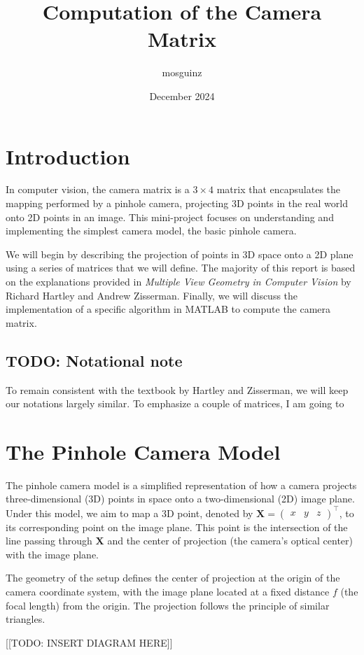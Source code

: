 \documentclass[12pt]{article}
\title{Computation of the Camera Matrix}
\author{mosguinz}
\date{December 2024}
\begin{document}
\section{Introduction}

In computer vision, the camera matrix is a $3 \times 4$ matrix that encapsulates the mapping performed by a pinhole camera, projecting 3D points in the real world onto 2D points in an image. This mini-project focuses on understanding and implementing the simplest camera model, the basic pinhole camera.

We will begin by describing the projection of points in 3D space onto a 2D plane using a series of matrices that we will define. The majority of this report is based on the explanations provided in \textit{Multiple View Geometry in Computer Vision} by Richard Hartley and Andrew Zisserman. Finally, we will discuss the implementation of a specific algorithm in MATLAB to compute the camera matrix.

\subsection{TODO: Notational note}

To remain consistent with the textbook by Hartley and Zisserman, we will keep our notations largely similar. To emphasize a couple of matrices, I am going to 

\section{The Pinhole Camera Model}

The pinhole camera model is a simplified representation of how a camera projects three-dimensional (3D) points in space onto a two-dimensional (2D) image plane. Under this model, we aim to map a 3D point, denoted by 
$\mathbf{X} = \begin{pmatrix} x & y & z \end{pmatrix}^\top$, 
to its corresponding point on the image plane. This point is the intersection of the line passing through $\mathbf{X}$ and the center of projection (the camera's optical center) with the image plane.

The geometry of the setup defines the center of projection at the origin of the camera coordinate system, with the image plane located at a fixed distance $f$ (the focal length) from the origin. The projection follows the principle of similar triangles.

[[TODO: INSERT DIAGRAM HERE]]
\end{document}
